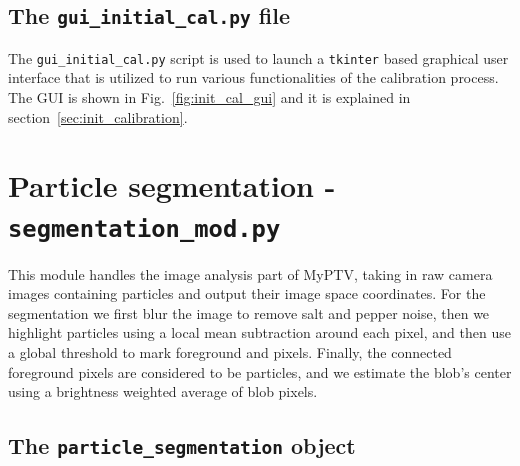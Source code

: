 \documentclass[10pt,a4paper]{article}
\begin{document}
\subsection{The \texttt{gui\_initial\_cal.py} file}

The \texttt{gui\_initial\_cal.py} script is used to launch a \texttt{tkinter} based graphical user interface that is utilized to run various functionalities of the calibration process. The GUI is shown in  Fig.~\ref{fig:init_cal_gui} and it is explained in section~\ref{sec:init_calibration}.












\section{Particle segmentation - \texttt{segmentation\_mod.py}} 


This module handles the image analysis part of MyPTV, taking in raw camera images containing particles and output their image space coordinates. For the segmentation we first blur the image to remove salt and pepper noise, then we highlight particles using a local mean subtraction around each pixel, and then use a global threshold to mark foreground and  pixels. Finally, the connected foreground pixels are considered to be particles, and we estimate the blob's center using a brightness weighted average of blob pixels.



\subsection{The \texttt{particle\_segmentation} object} 
\end{document}
